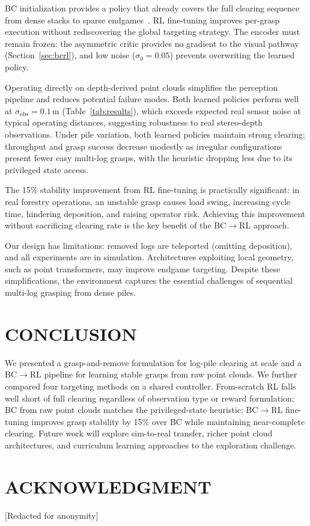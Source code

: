 \documentclass[letterpaper, 10 pt, conference]{ieeeconf}
\begin{document}
BC initialization provides a policy that already covers the full clearing sequence from dense stacks to sparse endgames~\cite{rajeswaran2018learning}. RL fine-tuning improves per-grasp execution without rediscovering the global targeting strategy. The encoder must remain frozen: the asymmetric critic provides no gradient to the visual pathway (Section~\ref{sec:bcrl}), and low noise ($\sigma_0 = 0.05$) prevents overwriting the learned policy.

Operating directly on depth-derived point clouds simplifies the perception pipeline and reduces potential failure modes. Both learned policies perform well at $\sigma_{\mathrm{obs}} = 0.1$\,m (Table~\ref{tab:results}), which exceeds expected real sensor noise at typical operating distances, suggesting robustness to real stereo-depth observations. Under pile variation, both learned policies maintain strong clearing; throughput and grasp success decrease modestly as irregular configurations present fewer easy multi-log grasps, with the heuristic dropping less due to its privileged state access.

The 15\% stability improvement from RL fine-tuning is practically significant: in real forestry operations, an unstable grasp causes load swing, increasing cycle time, hindering deposition, and raising operator risk. Achieving this improvement without sacrificing clearing rate is the key benefit of the BC$\to$RL approach.

Our design has limitations: removed logs are teleported (omitting deposition), and all experiments are in simulation. Architectures exploiting local geometry, such as point transformers, may improve endgame targeting. Despite these simplifications, the environment captures the essential challenges of sequential multi-log grasping from dense piles.

\section{CONCLUSION}
We presented a grasp-and-remove formulation for log-pile clearing at scale and a BC$\to$RL pipeline for learning stable grasps from raw point clouds. We further compared four targeting methods on a shared controller.
From-scratch RL falls well short of full clearing regardless of observation type or reward formulation; BC from raw point clouds matches the privileged-state heuristic; BC$\to$RL fine-tuning improves grasp stability by 15\% over BC while maintaining near-complete clearing.
Future work will explore sim-to-real transfer, richer point cloud architectures, and curriculum learning approaches to the exploration challenge.

\addtolength{\textheight}{-12cm}  %

\section*{ACKNOWLEDGMENT}
[Redacted for anonymity]



\end{document}
